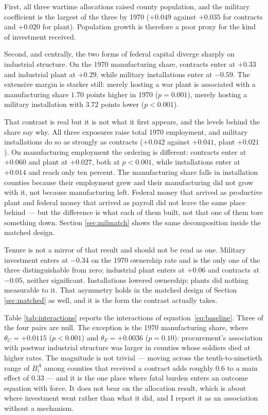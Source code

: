 \documentclass[12pt]{article}
\begin{document}
First, all three wartime allocations raised county population, and the military
coefficient is the largest of the three by 1970 ($+0.049$ against $+0.035$ for
contracts and $+0.020$ for plant). Population growth is therefore a poor proxy for
the kind of investment received.

Second, and centrally, the two forms of federal capital diverge sharply on
industrial structure. On the 1970 manufacturing share, contracts enter at $+0.33$
and industrial plant at $+0.29$, while military installations enter at $-0.59$.
The extensive margin is starker still: merely hosting a war plant is associated
with a manufacturing share $1.70$ points higher in 1970 ($p = 0.001$), merely
hosting a military installation with $3.72$ points lower ($p < 0.001$).

That contrast is real but it is not what it first appears, and the levels behind
the share say why. All three exposures raise total 1970 employment, and military
installations do so as strongly as contracts ($+0.042$ against $+0.041$, plant
$+0.021$). On manufacturing employment the ordering is different: contracts enter
at $+0.060$ and plant at $+0.027$, both at $p<0.001$, while installations enter at
$+0.014$ and reach only ten percent. The manufacturing share falls in installation
counties because their employment grew and their manufacturing did not grow with
it, not because manufacturing left. Federal money that arrived as productive plant
and federal money that arrived as payroll did not leave the same place behind ---
but the difference is what each of them built, not that one of them tore something
down. Section \ref{sec:milmatch} shows the same decomposition inside the matched
design.

Tenure is not a mirror of that result and should not be read as one. Military
investment enters at $-0.34$ on the 1970 ownership rate and is the only one of
the three distinguishable from zero; industrial plant enters at $+0.06$ and
contracts at $-0.05$, neither significant. Installations lowered ownership;
plants did nothing measurable to it. That asymmetry holds in the matched design
of Section \ref{sec:matched} as well, and it is the form the contrast actually
takes.

Table \ref{tab:interactions} reports the interactions of
equation~\eqref{eq:baseline}. Three of the four pairs are null. The exception is
the 1970 manufacturing share, where $\theta_C = +0.0115$ ($p < 0.001$) and
$\theta_F = +0.0036$ ($p = 0.10$): procurement's association with postwar
industrial structure was larger in counties whose soldiers died at higher rates.
The magnitude is not trivial --- moving across the tenth-to-ninetieth range of
$B_i^{A}$ among counties that received a contract adds roughly $0.6$ to a main
effect of $0.33$ --- and it is the one
place where fatal burden enters an outcome equation with force. It does not bear
on the allocation result, which is about where investment went rather than what
it did, and I report it as an association without a mechanism.
\end{document}

